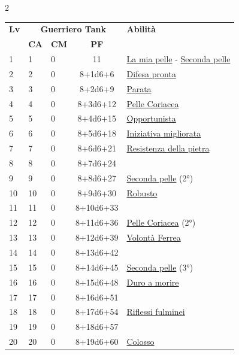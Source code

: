 {\small


\begin{multicols}{2}



\noindent\begin{tabularx}{\linewidth}{p{0.55cm}|p{0.55cm}p{0.55cm}c|X|}
	\toprule
 \rowcolor{gray!20}	\textbf{Lv} & \multicolumn{3}{c|}{\textbf{Guerriero Tank}} & \textbf{Abilità} \\
& \centering\arraybackslash \textbf{CA} & \centering\arraybackslash \textbf{CM} & \centering\arraybackslash \textbf{PF} & \\
	\toprule
	1 & 1 & 0 & 11 & \hyperlink{La mia pelle}{La mia pelle} - \hyperlink{Seconda pelle}{Seconda pelle}\\
	\rowcolor{gray!20}2 & 2 & 0 & 8+1d6+6 & \hyperlink{Difesa pronta}{Difesa pronta}\\
	3 & 3 & 0 & 8+2d6+9 & \hyperlink{Parata}{Parata}\\
	\rowcolor{gray!20}4 & 4 & 0 & 8+3d6+12 & \hyperlink{Pelle Coriacea}{Pelle Coriacea}\\
	5 & 5 & 0 & 8+4d6+15 & \hyperlink{Opportunista}{Opportunista}\\
	\rowcolor{gray!20}6 & 6 & 0 & 8+5d6+18 & \hyperlink{Iniziativa migliorata}{Iniziativa migliorata}\\
	7 & 7 & 0 & 8+6d6+21 & \hyperlink{Resistenza della pietra}{Resistenza della pietra}\\
	\rowcolor{gray!20}8 & 8 & 0 & 8+7d6+24 & \\
	9 & 9 & 0 & 8+8d6+27 & \hyperlink{Seconda pelle}{Seconda pelle} (2°)\\
	\rowcolor{gray!20}10 & 10 & 0 & 8+9d6+30 & \hyperlink{Robusto}{Robusto}\\
	11 & 11 & 0 & 8+10d6+33 & \\
	\rowcolor{gray!20}12 & 12 & 0 & 8+11d6+36 & \hyperlink{Pelle Coriacea}{Pelle Coriacea} (2°)\\
	13 & 13 & 0 & 8+12d6+39 & \hyperlink{Volonta' Ferrea}{Volontà Ferrea}\\
	\rowcolor{gray!20}14 & 14 & 0 & 8+13d6+42 & \\
	15 & 15 & 0 & 8+14d6+45 & \hyperlink{Seconda pelle}{Seconda pelle} (3°)\\
	\rowcolor{gray!20}16 & 16 & 0 & 8+15d6+48 & \hyperlink{Duro a morire}{Duro a morire}\\
	17 & 17 & 0 & 8+16d6+51 & \\
	\rowcolor{gray!20}18 & 18 & 0 & 8+17d6+54 & \hyperlink{Riflessi fulminei}{Riflessi fulminei}\\
	19 & 19 & 0 & 8+18d6+57 & \\
	\rowcolor{gray!20}20 & 20 & 0 & 8+19d6+60 & \hyperlink{Colosso}{Colosso}\\
\end{tabularx}


\end{multicols}}
